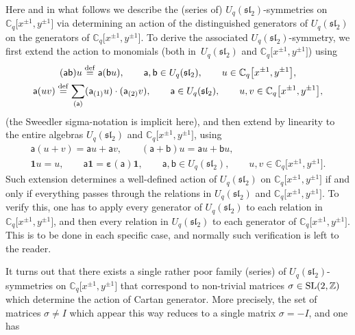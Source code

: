 \documentclass[pdftex]{sigma}
\numberwithin{equation}{section}
\begin{document}
Here and in what follows we describe the (series of) $U_q(\mathfrak{sl}_2)$-symmetries on $\mathbb{C}_q\big[x^{\pm 1},y^{\pm 1}\big]$ via determining an action of the distinguished generators of $U_q(\mathfrak{sl}_2)$ on the generators of $\mathbb{C}_q\big[x^{\pm 1}{,}y^{\pm 1}\big]$. To derive the associated $U_q(\mathfrak{sl}_2)$-symmetry, we first extend the action to monomials (both in~$U_q(\mathfrak{sl}_2)$ and $\mathbb{C}_q\big[x^{\pm 1},y^{\pm 1}\big]$) using
\begin{gather*}
(\mathsf{ab})u \overset{\rm def}{=}\mathsf{a}(\mathsf{b}u), \qquad \mathsf{a},\mathsf{b} \in U_q(\mathfrak{sl}_2), \qquad u \in\mathbb{C}_q\big[x^{\pm 1},y^{\pm 1}\big],\\
 \mathsf{a}(uv) \overset{\rm def}{=} \sum_{(\mathsf{a})}(\mathsf{a}_{(1)}u)\cdot(\mathsf{a}_{(2)}v), \qquad \mathsf{a} \in U_q(\mathfrak{sl}_2), \qquad u,v \in\mathbb{C}_q\big[x^{\pm 1},y^{\pm 1}\big],
\end{gather*}
(the Sweedler sigma-notation is implicit here), and then extend by linearity to the entire algebras $U_q(\mathfrak{sl}_2)$ and $\mathbb{C}_q\big[x^{\pm 1},y^{\pm 1}\big]$, using
\begin{gather*}
\mathsf{a}(u+v)=\mathsf{a}u+\mathsf{a}v,\qquad (\mathsf{a}+\mathsf{b})u=\mathsf{a}u+\mathsf{b}u,\\
\mathbf{1}u=u,\qquad \mathsf{a}\mathbf{1}=\boldsymbol{\varepsilon}(\mathsf{a})\mathbf{1}, \qquad\mathsf{a},\mathsf{b}\in U_q(\mathfrak{sl}_2),\qquad u,v\in\mathbb{C}_q\big[x^{\pm 1},y^{\pm 1}\big].
\end{gather*}
Such extension determines a well-defined action of $U_q(\mathfrak{sl}_2)$ on $\mathbb{C}_q\big[x^{\pm 1},y^{\pm 1}\big]$ if and only if everything passes through the relations in $U_q(\mathfrak{sl}_2)$ and $\mathbb{C}_q\big[x^{\pm 1},y^{\pm 1}\big]$. To verify this, one has to apply every generator of $U_q(\mathfrak{sl}_2)$ to each relation in $\mathbb{C}_q\big[x^{\pm 1},y^{\pm 1}\big]$, and then every relation in $U_q(\mathfrak{sl}_2)$ to each generator of $\mathbb{C}_q\big[x^{\pm 1},y^{\pm 1}\big]$. This is to be done in each specific case, and normally such verification is left to the reader.

It turns out that there exists a single rather poor family (series) of $U_q(\mathfrak{sl}_2)$-symmetries on $\mathbb{C}_q\big[x^{\pm 1},y^{\pm 1}\big]$
that correspond to non-trivial matrices $\sigma\in {\rm SL}(2,\mathbb{Z})$ which determine the action of Cartan generator. More precisely, the set of matrices $\sigma\ne I$ which appear this way reduces to a single matrix $\sigma=-I$, and one has
\end{document}
